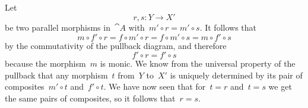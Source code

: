 \subsection{}

Let
\[
	r, s \colon Y \to X'
\]
be two parallel morphisms in~$\cat{A}$ with~$m' ∘ r = m' ∘ s$.
It follows that
\[
	m ∘ f' ∘ r
	=
	f ∘ m' ∘ r
	=
	f ∘ m' ∘ s
	=
	m ∘ f' ∘ s
\]
by the commutativity of the pullback diagram, and therefore
\[
	f' ∘ r = f' ∘ s
\]
because the morphism~$m$ is monic.
We know from the universal property of the pullback that any morphism~$t$ from~$Y$ to~$X'$ is uniquely determined by its pair of composites~$m' ∘ t$ and~$f' ∘ t$.
We have now seen that for~$t = r$ and~$t = s$ we get the same pairs of composites, so it follows that~$r = s$.
